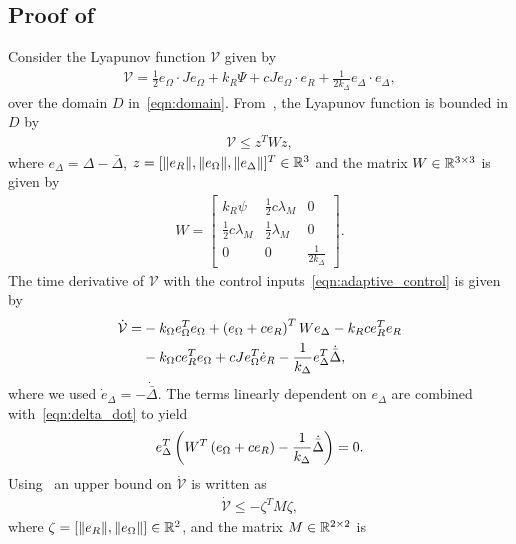 \documentclass[fleqn]{IJCAS}  %
\begin{document}
\begin{multicols}{2}
\subsection{Proof of~}\label{proof:adaptive_control}
Consider the Lyapunov function \( \mathcal{V} \) given by
\begin{align*}
	\mathcal{V} = \frac{1}{2} e_\Omega \cdot J e_\Omega + k_R \Psi + c J e_\Omega \cdot e_R + \frac{1}{2 k_\Delta} e_\Delta \cdot e_\Delta , \label{eqn:v_adapt}
\end{align*}
over the domain \( D \) in~\cref{eqn:domain}.
From~, the Lyapunov function is bounded in \( D \) by
\begin{align*} %
	\mathcal{V} \leq z^T W z ,
\end{align*}
where \( e_\Delta = \Delta - \bar{\Delta} \), \( z = [\|e_R\|,\|e_\Omega\|,\|e_\Delta\|]^T\in\mathbb{R}^3 \) and the matrix \(W \in \mathbb{R}^{3 \times 3}\) is given by
\begin{gather*}
	W = \begin{bmatrix}
		k_R \psi & \frac{1}{2} c \lambda_M & 0 \\
		\frac{1}{2} c \lambda_M & \frac{1}{2} \lambda_M & 0 \\
		0 & 0 & \frac{1}{2 k_\Delta}
	\end{bmatrix} .
\end{gather*}
The time derivative of \( \mathcal{V}\) with the control inputs~\cref{eqn:adaptive_control} is given by
\begin{align*}
	\dot{\mathcal{V}} =& - k_\Omega e_\Omega^T e_\Omega + \left( e_\Omega + c e_R \right)^T W e_\Delta - k_R c e_R^T e_R \nonumber\\
	&- k_\Omega c e_R^T e_\Omega + c J e_\Omega^T \dot{e}_R - \frac{1}{k_\Delta} e_\Delta^T \dot{\bar{\Delta}} , \label{eqn:vdot}
\end{align*}
where we used \( \dot{e}_\Delta = - \dot{\bar{\Delta}} \).
The terms linearly dependent on \( e_\Delta\) are combined with~\cref{eqn:delta_dot} to yield
\begin{align*}
	 e_\Delta^T \left( W^T \left( e_\Omega + c e_R \right) - \frac{1}{k_\Delta} \dot{\bar{\Delta}} \right) = 0 . 
\end{align*}
Using~ an upper bound on \( \dot{\mathcal{V}} \) is written as
\begin{gather*}
	\dot{\mathcal{V}} \leq -\zeta^T M \zeta ,
\end{gather*}
where $\zeta=[\|e_R\|,\|e_\Omega\|]\in\mathbb{R}^2$, and the matrix \( M \in \mathbb{R}^{2 \times 2} \) is 

\end{multicols}
\end{document}
